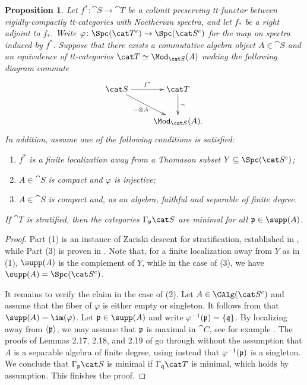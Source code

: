 \documentclass{amsart}%
\numberwithin{equation}{section}%
\newtheorem{Prop}[subsection]{Proposition}
\theoremstyle{remark}
\newcounter{enum-resume-hack}
\begin{document}
\begin{Prop}\label{prop:ttdescent}
Let $f^*\colon \cat S \to \cat T$ be a colimit preserving tt-functor between rigidly-compactly tt-categories with Noetherian spectra, and let $f_*$ be a right adjoint to $f_*$. Write $\varphi\colon \Spc(\cat T^c) \to \Spc(\cat S^c)$ for the map on spectra induced by $f^*$. Suppose that there exists a commutative algebra object $A \in \cat S$ and an equivalence of tt-categories $\cat T \simeq \Mod_{\cat S}(A)$ making the following diagram commute
\[
\xymatrix{\cat S \ar[r]^-{f^*} \ar[dr]_-{-\otimes A} & \cat T \ar[d]^-{\sim} \\
& \Mod_{\cat S}(A).}
\]
In addition, assume one of the following conditions is satisfied:
    \begin{enumerate}
        \item[(1)] %
        $f^*$ is a finite localization away from a Thomason subset $Y \subseteq \Spc(\cat S^c)$;
        \item[(2)] %
        $A \in \cat S$ is compact and $\varphi$ is injective;
        \item[(3)] %
        $A \in \cat S$ is compact and, as an algebra, faithful and separable of finite degree. 
    \end{enumerate}
If $\cat T$ is stratified, then the categories $\Gamma_{\frak p}\cat S$ are minimal for all $\frak p \in \supp(A)$.
\end{Prop}
\begin{proof}
Part (1) is an instance of Zariski descent for stratification, established in \cite[Cor.~5.3 and Rem.~5.4]{bhs1}, while Part (3) is proven in \cite[Thm.~2.14]{barthel_integral1}. Note that, for a finite localization away from $Y$ as in (1), $\supp(A)$ is the complement of $Y$, while in the case of (3), we have $\supp(A) = \Spc(\cat S^c)$.

It remains to verify the claim in the case of (2). Let $A \in \CAlg(\cat S^c)$ and assume that the fiber of $\varphi$ is either empty or singleton. It follows from \cite[Thm.~1.7]{Balmer18} that $\supp(A) = \im(\varphi)$. Let $\frak p \in \supp(A)$ and write $\varphi^{-1}(\frak p) = \{\frak q\}$. By localizing away from $\langle \frak p \rangle$, we may assume that $\frak p$ is maximal in $\cat C$, see for example \cite[Ex.~5.7]{Sanders21pp}. The proofs of Lemmas 2.17, 2.18, and 2.19 of \cite{barthel_integral1} go through without the assumption that $A$ is a separable algebra of finite degree, using instead that $\varphi^{-1}(\frak p)$ is a singleton. We conclude that $\Gamma_{\frak p}\cat S$ is minimal if $\Gamma_{\frak q}\cat T$ is minimal, which holds by assumption. This finishes the proof.
\end{proof}
\end{document}
